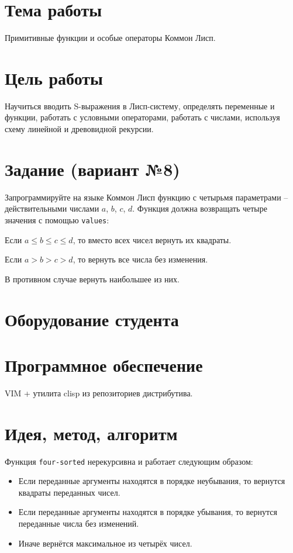 \documentclass[12pt]{article}
\begin{document}

\section{Тема работы}
Примитивные функции и особые операторы Коммон Лисп.

\section{Цель работы}
Научиться вводить S-выражения в Лисп-систему, определять переменные и функции, работать с условными операторами, работать с числами, используя схему линейной и древовидной рекурсии.

\section{Задание (вариант №8)}
Запрограммируйте на языке Коммон Лисп функцию с четырьмя параметрами --
действительными числами $a$, $b$, $c$, $d$.
Функция должна возвращать четыре значения с помощью {\tt values}:

Если $a \leq b \leq c \leq d$, то вместо всех чисел вернуть их квадраты.

Если $a > b > c > d$, то вернуть все числа без изменения.

В противном случае вернуть наибольшее из них.

\section{Оборудование студента}
\mypc

\section{Программное обеспечение}
VIM + утилита clisp из репозиториев дистрибутива.

\section{Идея, метод, алгоритм}

Функция {\tt four-sorted} нерекурсивна и работает следующим образом:
\begin{itemize}
\setlength{\itemsep}{-1mm} %
\item Если переданные аргументы находятся в порядке неубывания, то вернутся
квадраты переданных чисел.
\item Если переданные аргументы находятся в порядке убывания, то вернутся
переданные числа без изменений.
\item Иначе вернётся максимальное из четырёх чисел.
\end{itemize}
\end{document}
